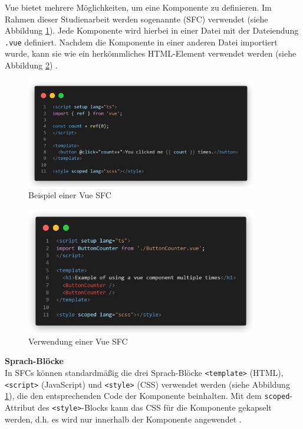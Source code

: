 Vue bietet mehrere Möglichkeiten, um eine Komponente zu definieren. Im Rahmen dieser Studienarbeit werden sogenannte  (\acs{SFC}) verwendet (siehe Abbildung \ref{fig:vue-example}). Jede Komponente wird hierbei in einer Datei mit der Dateiendung \lstinline{.vue} definiert. Nachdem die Komponente in einer anderen Datei importiert wurde, kann sie wie ein herkömmliches HTML-Element verwendet werden (siehe Abbildung \ref{fig:vue-example-usage}) \cite[vgl.][]{VueComponentBasics}.

\begin{figure}[!htb]
  \includegraphics[width=0.9\textwidth]{images/vue-example.png}
  \centering
  \caption[Beispiel einer Vue-Komponente]{Beispiel einer Vue \ac{SFC} \cite{VueComponentBasics}}
  \label{fig:vue-example}
\end{figure}

\begin{figure}[!htb]
  \includegraphics[width=0.9\textwidth]{images/vue-example-usage.png}
  \centering
  \caption[Verwendung einer Vue-Komponente]{Verwendung einer Vue \ac{SFC} \cites[vgl.][]{VueComponentBasics}[vgl.][]{VueSFC}}
  \label{fig:vue-example-usage}
\end{figure}

\textbf{Sprach-Blöcke} \\
In \acp{SFC} können standardmäßig die drei Sprach-Blöcke \lstinline{<template>} (HTML), \lstinline{<script>} (JavaScript) und \lstinline{<style>} (CSS) verwendet werden (siehe Abbildung \ref{fig:vue-example}), die den entsprechenden Code der Komponente beinhalten. Mit dem \lstinline{scoped}-Attribut des \lstinline{<style>}-Blocks kann das CSS für die Komponente gekapselt werden, d.h. es wird nur innerhalb der Komponente angewendet \cite[vgl.][]{VueSFC}.

